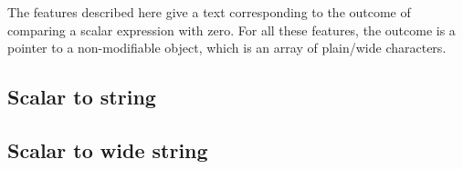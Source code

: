 \def\Subsection#1{\subsection{#1}}

The features described here give a text corresponding to
the outcome of comparing a scalar expression with zero.
For all these features, the outcome is a pointer to a non-modifiable object,
which is an array of plain/wide characters.

\Subsection{Scalar to string}

\Subsection{Scalar to wide string}
